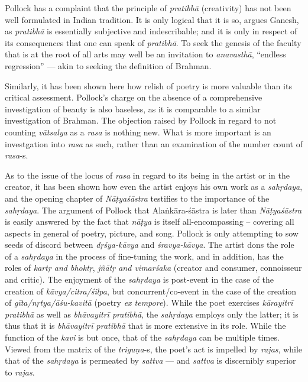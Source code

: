 Pollock has a complaint that the principle of \textsl{pratibhā} (creativity) has not been well formulated in Indian tradition. It is only logical that it is so, argues Ganesh, as \textsl{pratibhā} is essentially subjective and indescribable; and it is only in respect of its consequences that one can speak of \textsl{pratibhā}. To seek the genesis of the faculty that is at the root of all arts may well be an invitation to \textsl{anavasthā}, “endless regression” --- akin to seeking the definition of Brahman. 

Similarly, it has been shown here how relish of poetry is more valuable than its critical assessment. Pollock’s charge on the absence of a comprehensive investigation of beauty is also baseless, as it is comparable to a similar investigation of Brahman. The objection raised by Pollock in regard to not counting \textsl{vātsalya} as a \textsl{rasa} is nothing new. What is more important is an investgation into \textsl{rasa} as such, rather than an examination of the number count of \textsl{rasa}-s.

As to the issue of the locus of \textsl{rasa} in regard to its being in the artist or in the creator, it has been shown how even the artist enjoys his own work as a \textsl{sahṛdaya}, and the opening chapter of \textsl{Nāṭyaśāstra} testifies to the importance of the \textsl{sahṛdaya}. The argument of Pollock that Alaṅkāra-śāstra is later than \textsl{Nāṭyaśāstra} is easily answered by the fact that \textsl{nāṭya} is itself all-encompassing -- covering all aspects in general of poetry, picture, and song. Pollock is only attempting to sow seeds of discord between \textsl{dṛśya-kāvya} and \textsl{śravya-kāvya}. The artist dons the role of a \textsl{sahṛdaya} in the process of fine-tuning the work, and in addition, has the roles of \textsl{kartṛ and bhoktṛ}, \textsl{jñātṛ and vimarśaka} (creator and consumer, connoisseur and critic). The enjoyment of the \textsl{sahṛdaya} is post-event in the case of the creation of \textsl{kāvya/citra/śilpa}, but concurrent/co-event in the case of the creation of \textsl{gīta/nṛtya/āśu-kavitā} (poetry \textsl{ex tempore}). While the poet exercises \textsl{kārayitrī pratibhā} as well as \textsl{bhāvayitrī pratibhā}, the \textsl{sahṛdaya} employs only the latter; it is thus that it is \textsl{bhāvayitrī pratibhā} that is more extensive in its role. While the function of the \textsl{kavi} is but once, that of the \textsl{sahṛdaya} can be multiple times. Viewed from the matrix of the \textsl{triguṇa}-s, the poet's act is impelled by \textsl{rajas}, while that of the \textsl{sahṛdaya} is permeated by \textsl{sattva} --- and \textsl{sattva} is discernibly superior to \textsl{rajas}.

